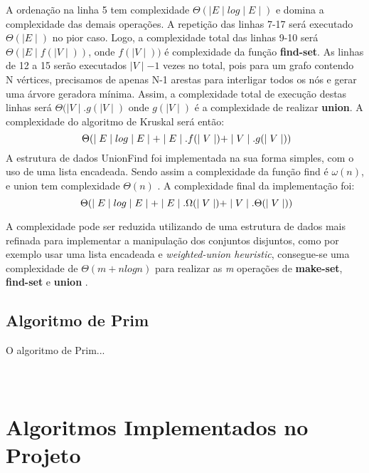 \documentclass[a4paper,12pt]{article}
\begin{document}
A ordenação na linha 5 tem complexidade \emph{ $\Theta( \mid E\mid log \mid E\mid )$ } e domina a complexidade das demais operações.
A repetição das linhas 7-17 será executado \emph{$\Theta(\mid E\mid)$} no pior caso.
Logo, a complexidade total das linhas 9-10 será \emph{$\Theta(\mid E\mid f(\mid V\mid))$}, onde $f(\mid V\mid))$ é complexidade da função \textbf{{\color{blue}find-set}}.
As linhas de 12 a 15 serão executados $\mid V\mid -1$ vezes no total, pois para um grafo contendo N vértices, precisamos de apenas N-1 arestas para interligar todos os nós e gerar uma árvore geradora mínima. 
Assim, a complexidade total de execução destas linhas será \emph{ $\Theta(\mid V\mid . g(\mid V\mid)$} onde $g(\mid V\mid)$ é a complexidade de realizar \textbf{{\color{blue}union}}.
A complexidade do algoritmo de Kruskal será então: \[ \emph{ $\Theta(\mid E\mid log \mid E\mid + \mid E\mid .f(\mid V\mid) + \mid V\mid . g(\mid V\mid)) $}\]
A estrutura de dados UnionFind foi implementada na sua forma simples, com o uso de uma lista encadeada. Sendo assim a complexidade da função find é \emph{$\omega(n)$}, e union tem complexidade \emph{$\Theta(n)$} \cite{Cormem}. A complexidade final da implementação foi:
\[ \emph{ $\Theta(\mid E\mid log \mid E\mid + \mid E\mid .\Omega(\mid V\mid) + \mid V\mid . \Theta(\mid V\mid)) $}\]

A complexidade pode ser reduzida utilizando de uma estrutura de dados mais refinada para implementar a manipulação dos conjuntos disjuntos, como por exemplo usar uma lista encadeada e \emph{weighted-union heuristic}\cite{Cormem}, consegue-se uma complexidade de \emph{$\Theta(m+nlogn) $} para realizar as \emph{m} operações de \textbf{{\color{blue}make-set}}, \textbf{{\color{blue}find-set}} e \textbf{{\color{blue}union}} \cite{Cormem}.

\subsection{Algoritmo de Prim}
O algoritmo de Prim...	

\newpage
\appendix
\section{\\Algoritmos Implementados no Projeto} \label{App:AppendixA}
\end{document}
